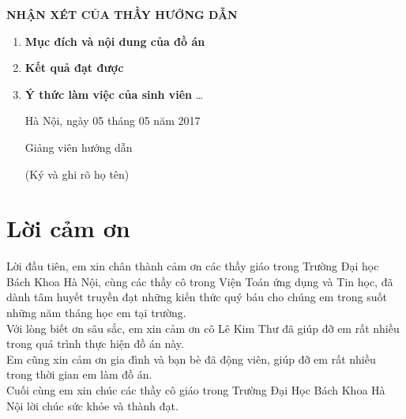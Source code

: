 \documentclass[14pt, oneside, a4paper, openany]{scrartcl}
\begin{document}
\newpage
\thispagestyle{empty}
\centerline{\Large\bf NHẬN XÉT CỦA THẦY HƯỚNG DẪN}
\begin{enumerate}
	\item \textbf{Mục đích và nội dung của đồ án}
	\newline
	\newline
	\newline
	\newline
	\item \textbf{Kết quả đạt được}
	\newline
	\newline
	\newline
	\newline
	\item \textbf{Ý thức làm việc của sinh viên} \ldots
	\newline
	\newline
	\newline
	\newline
	\newline
	
	\begin{flushright}
		Hà Nội, ngày 05 tháng 05 năm 2017
	\end{flushright}
	\hspace{95 mm}Giảng viên hướng dẫn
	
	\hspace{95 mm}(Ký và ghi rõ họ tên)
\end{enumerate}

\newpage
\thispagestyle{empty}
\tableofcontents
\newpage
\thispagestyle{empty}
\listoffigures
\listoftables
\newpage
\section{Lời cảm ơn}
Lời đầu tiên, em xin chân thành cảm ơn các thầy giáo trong Trường Đại học Bách Khoa Hà Nội, cùng các thầy cô trong Viện Toán ứng dụng và Tin học, đã dành tâm huyết truyền đạt những kiến thức quý báu cho chúng em trong suốt những năm tháng học em tại trường.\\
Với lòng biết ơn sâu sắc, em xin cảm ơn cô Lê Kim Thư đã giúp đỡ em rất nhiều trong quá trình thực hiện đồ án này.\\
Em cũng xin cảm ơn gia đình và bạn bè đã động viên, giúp đỡ em rất nhiều trong thời gian em làm đồ án.\\
Cuối cùng em xin chúc các thầy cô giáo trong Trường Đại Học Bách Khoa Hà Nội lời chúc sức khỏe và thành đạt.
\end{document}
